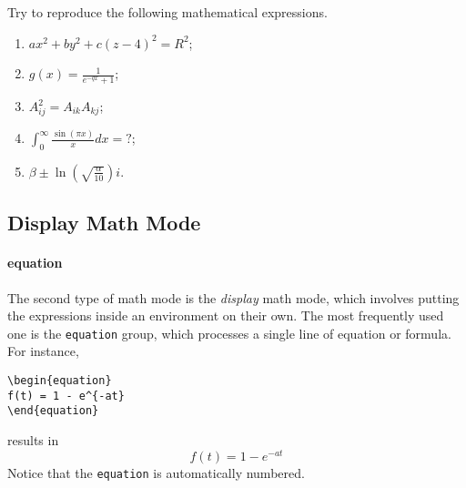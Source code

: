 \begin{exercisebox}
\begin{Exercise}
Try to reproduce the following mathematical expressions.
\begin{enumerate}[label=\alph*)]
    \item $ax^2 + by^2 + c(z-4)^2 = R^2$;
    \item $g(x) = \frac{1}{e^{-qx}+1}$;
    \item $A^2_{ij} = A_{ik}A_{kj}$;
    \item $\int_0^{\infty} \frac{\sin(\pi x)}{x}dx = ?$;\footnotemark
    \item $\beta\pm\ln(\sqrt{\frac{\alpha}{10}})i$.
\end{enumerate}
\end{Exercise}
\end{exercisebox}

\subsection{Display Math Mode}

\paragraph{equation}
The second type of math mode is the \textit{display} math mode, which involves putting the expressions inside an environment on their own. The most frequently used one is the \texttt{equation} group, which processes a single line of equation or formula. For instance,
\begin{lstlisting}
\begin{equation}
f(t) = 1 - e^{-at}
\end{equation}
\end{lstlisting}
results in
\begin{equation}
f(t) = 1 - e^{-at}
\end{equation}
Notice that the \texttt{equation} is automatically numbered.

